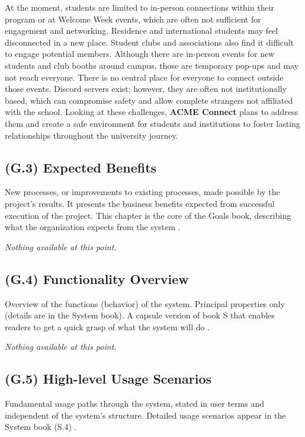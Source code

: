 \documentclass[12pt,letterpaper]{article}
\begin{document}
At the moment, students are limited to in-person connections within their program or at Welcome Week events, which are often not sufficient for engagement and networking. Residence and international students may feel disconnected in a new place. Student clubs and associations also find it difficult to engage potential members. Although there are in-person events for new students and club booths around campus, those are temporary pop-ups and may not reach everyone. There is no central place for everyone to connect outside those events. Discord servers exist; however, they are often not institutionally based, which can compromise safety and allow complete strangers not affiliated with the school. Looking at these challenges, \textbf{ACME Connect} plans to address them and create a safe environment for students and institutions to foster lasting relationships throughout the university journey.

\subsection{(G.3) Expected Benefits}
New processes, or improvements to existing processes, made possible by the project's results. It presents the business benefits expected from successful execution of the project. This chapter is the core of the Goals book, describing what the organization expects from the system \cite{meyer2022}.

\textit{Nothing available at this point.}

\subsection{(G.4) Functionality Overview}
Overview of the functions (behavior) of the system. Principal properties only (details are in the System book). A capsule version of book S that enables readers to get a quick grasp of what the system will do \cite{meyer2022}.

\textit{Nothing available at this point.}

\subsection{(G.5) High-level Usage Scenarios}
Fundamental usage paths through the system, stated in user terms and independent of the system's structure. Detailed usage scenarios appear in the System book (S.4) \cite{meyer2022}.

\begin{center}
\end{center}
\end{document}
